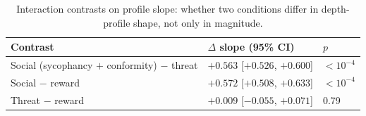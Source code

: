 \documentclass[11pt,letterpaper]{article}
\begin{document}
\begin{table}[H]
  \centering
  \caption{Pressure-specific residuals (total gap minus consequentiality gap) by layer and pressure
    condition, in activation units, with 95\% bootstrap CIs (10{,}000 resamples). Slope is the OLS
    coefficient of residual on layer index across L35--L47. Reward is given to two decimals because
    its CIs sit near zero.}
  \label{tab:signatures}
\end{table}

\begin{table}[H]
  \centering
  \caption{Interaction contrasts on profile slope: whether two conditions differ in depth-profile
    shape, not only in magnitude.}
  \label{tab:contrasts}
  \begin{tabular}{@{}lll@{}}
    \toprule
    \textbf{Contrast} & \textbf{$\Delta$ slope (95\% CI)} & \textbf{$p$} \\
    \midrule
    Social (sycophancy $+$ conformity) $-$ threat & $+0.563$ [$+0.526$, $+0.600$] & $<10^{-4}$ \\
    Social $-$ reward & $+0.572$ [$+0.508$, $+0.633$] & $<10^{-4}$ \\
    Threat $-$ reward & $+0.009$ [$-0.055$, $+0.071$] & 0.79 \\
    \bottomrule
  \end{tabular}
\end{table}
\end{document}
